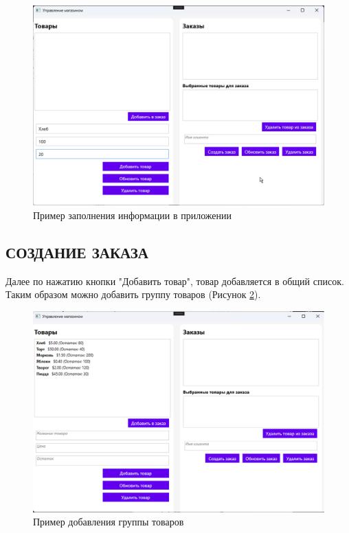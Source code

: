 \documentclass[12pt]{article}
\numberwithin{listing}{section}
\numberwithin{figure}{section}
\begin{document}
\begin{figure}[ht]
	\centering
	\includegraphics[width=1.0\textwidth]{fig/image 27.png}
	\caption{Пример заполнения информации в приложении}
	\label{fig:demo2}
\end{figure}

\pagebreak

\subsection{СОЗДАНИЕ ЗАКАЗА}

Далее по нажатию кнопки "Добавить товар", товар добавляется в общий список. Таким образом можно добавить группу товаров (Рисунок \ref{fig:demo3}).

\begin{figure}[ht]
	\centering
	\includegraphics[width=1.0\textwidth]{fig/image 60.png}
	\caption{Пример добавления группы товаров}
	\label{fig:demo3}
\end{figure}
\end{document}
